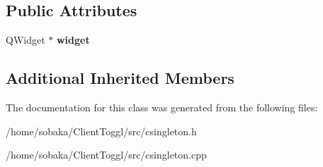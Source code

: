 \subsection*{Public Attributes}
\begin{DoxyCompactItemize}
\item 
\mbox{\label{classCSingleton_a5a40d1de085c5f3f99da1eb38c7ae985}} 
Q\+Widget $\ast$ {\bfseries widget}
\end{DoxyCompactItemize}
\subsection*{Additional Inherited Members}


The documentation for this class was generated from the following files\+:\begin{DoxyCompactItemize}
\item 
/home/sobaka/\+Client\+Toggl/src/csingleton.\+h\item 
/home/sobaka/\+Client\+Toggl/src/csingleton.\+cpp\end{DoxyCompactItemize}
